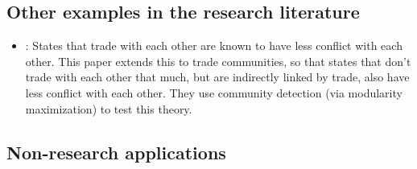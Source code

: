 
\hypertarget{other-research}{\subsection{Other examples in the research
literature}\label{other-research}}


\begin{itemize}
\tightlist
\item
  \autocite{lupu_trading_2013}: States that trade with each other are
  known to have less conflict with each other. This paper extends this
  to trade communities, so that states that don't trade with each other
  that much, but are indirectly linked by trade, also have less conflict
  with each other. They use community detection (via modularity
  maximization) to test this theory.
\end{itemize}


\subsection{Non-research applications}\label{non-research-applications}

